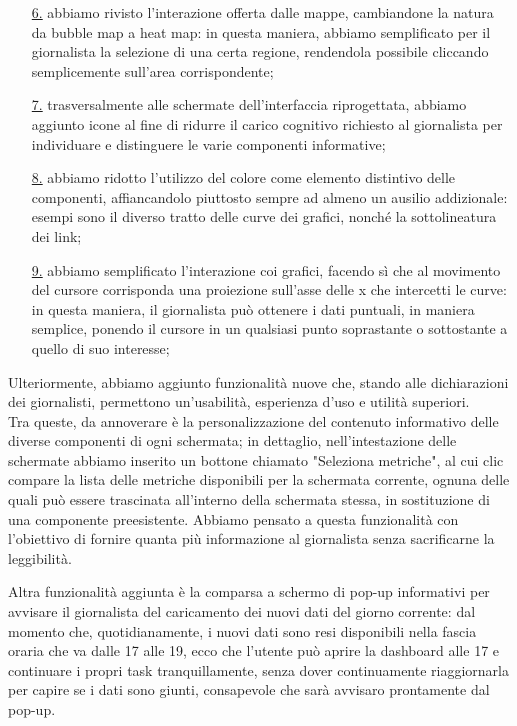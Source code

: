 \documentclass[../../main.tex]{subfiles}
\begin{document}
\begin{enumerate}
    \item [{\hyperref[el:6]{6.}}] abbiamo rivisto l'interazione offerta dalle mappe, cambiandone la natura da bubble map a heat map: in questa maniera, abbiamo semplificato per il giornalista la selezione di una certa regione, rendendola possibile cliccando semplicemente sull'area corrispondente;
    \item [{\hyperref[el:7]{7.}}] trasversalmente alle schermate dell'interfaccia riprogettata, abbiamo aggiunto icone al fine di ridurre il carico cognitivo richiesto al giornalista per individuare e distinguere le varie componenti informative;
    \item [{\hyperref[el:8]{8.}}] abbiamo ridotto l'utilizzo del colore come elemento distintivo delle componenti, affiancandolo piuttosto sempre ad almeno un ausilio addizionale: esempi sono il diverso tratto delle curve dei grafici, nonché la sottolineatura dei link;
    \item [{\hyperref[el:9]{9.}}] abbiamo semplificato l'interazione coi grafici, facendo sì che al movimento del cursore corrisponda una proiezione sull'asse delle x che intercetti le curve: in questa maniera, il giornalista può ottenere i dati puntuali, in maniera semplice, ponendo il cursore in un qualsiasi punto soprastante o sottostante a quello di suo interesse; 
\end{enumerate}
	
Ulteriormente, abbiamo aggiunto funzionalità nuove che, stando alle dichiarazioni dei giornalisti, permettono un'usabilità, esperienza d'uso e utilità superiori.\\
Tra queste, da annoverare è la personalizzazione del contenuto informativo delle diverse componenti di ogni schermata; in dettaglio, nell'intestazione delle schermate abbiamo inserito un bottone chiamato "Seleziona metriche", al cui clic compare la lista delle metriche disponibili per la schermata corrente, ognuna delle quali può essere trascinata all'interno della schermata stessa, in sostituzione di una componente preesistente. Abbiamo pensato a questa funzionalità con l'obiettivo di fornire quanta più informazione al giornalista senza sacrificarne la leggibilità.

Altra funzionalità aggiunta è la comparsa a schermo di pop-up informativi per avvisare il giornalista del caricamento dei nuovi dati del giorno corrente: dal momento che, quotidianamente, i nuovi dati sono resi disponibili nella fascia oraria che va dalle 17 alle 19, ecco che l'utente può aprire la dashboard alle 17 e continuare i propri task tranquillamente, senza dover continuamente riaggiornarla per capire se i dati sono giunti, consapevole che sarà avvisaro prontamente dal pop-up.
\end{document}
